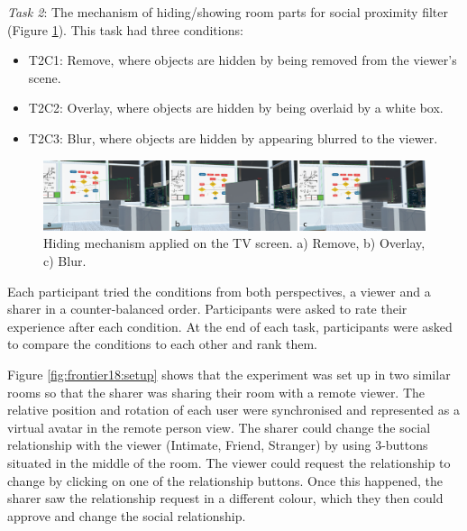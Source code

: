 \textit{Task 2}: The mechanism of hiding/showing room parts for social proximity filter (Figure \ref{fig:frontier18:hiding-mechanism}). This task had three conditions:

\begin{itemize}
    \item T2C1: Remove, where objects are hidden by being removed from the viewer's scene.
    \item T2C2: Overlay, where objects are hidden by being overlaid by a white box. 
    \item T2C3: Blur, where objects are hidden by appearing blurred to the viewer. 
\end{itemize}

\begin{figure}[H]
    \begin{center}
    \includegraphics[width=\linewidth]{images/frontier18/images-01.png}
    \caption{Hiding mechanism applied on the TV screen. a) Remove, b) Overlay, c) Blur.}\label{fig:frontier18:hiding-mechanism}
    \end{center}
\end{figure}

Each participant tried the conditions from both perspectives, a viewer and a sharer in a counter-balanced order. Participants were asked to rate their experience after each condition. At the end of each task, participants were asked to compare the conditions to each other and rank them. 

Figure \ref{fig:frontier18:setup} shows that the experiment was set up in two similar rooms so that the sharer was sharing their room with a remote viewer. The relative position and rotation of each user were synchronised and represented as a virtual avatar in the remote person view. The sharer could change the social relationship with the viewer (Intimate, Friend, Stranger) by using 3-buttons situated in the middle of the room. The viewer could request the relationship to change by clicking on one of the relationship buttons. Once this happened, the sharer saw the relationship request in a different colour, which they then could approve and change the social relationship.

